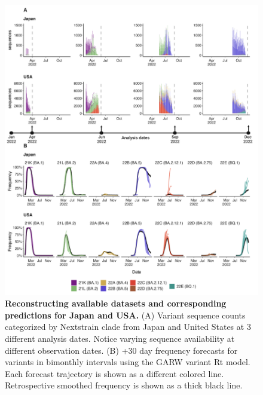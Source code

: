 \documentclass[11pt,oneside,letterpaper]{article}
\begin{document}
\begin{figure}[tb!]
	\centering
	\includegraphics[width=0.9\textwidth=0.01]{figures/Dynamic_est_env.png}
	\caption{
		\textbf{Reconstructing available datasets and corresponding predictions for Japan and USA.}
		(A) Variant sequence counts categorized by Nextstrain clade from Japan and United States at 3 different analysis dates.
		Notice varying sequence availability at different observation dates.
		(B) +30 day frequency forecasts for variants in bimonthly intervals using the GARW variant Rt model.
		Each forecast trajectory is shown as a different colored line.
		Retrospective smoothed frequency is shown as a thick black line.
	}
	\label{fig:dynamic_forecast_env}
\end{figure}
\end{document}
